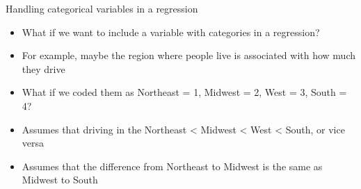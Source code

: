 %

\begin{frame}{Handling categorical variables in a regression}
  \begin{itemize}
    \item What if we want to include a variable with categories in a regression?
    \item For example, maybe the region where people live is associated with how much they drive
    \item What if we coded them as Northeast = 1, Midwest = 2, West = 3, South = 4?
    \pause\item Assumes that driving in the Northeast < Midwest < West < South, or vice versa
    \item Assumes that the difference from Northeast to Midwest is the same as Midwest to South
  \end{itemize}
\end{frame}

